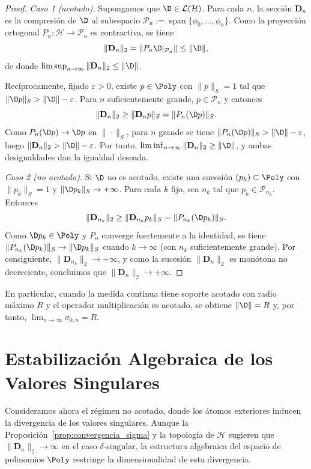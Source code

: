 \begin{proof}
	\emph{Caso 1 (acotado).} Supongamos que $\D\in\mathcal{L}(\mathcal{H})$. Para cada $n$, la sección $\mathbf{D}_n$ es la compresión de $\D$ al subespacio $\mathcal{P}_n:=\operatorname{span}\{\phi_0,\dots,\phi_n\}$. Como la proyección ortogonal $P_n:\mathcal{H}\to\mathcal{P}_n$ es contractiva, se tiene
	\[
		\|\mathbf{D}_n\|_2=\|P_n\D|_{\mathcal{P}_n}\|\le\|\D\|,
	\]
	de donde $\limsup_{n\to\infty}\|\mathbf{D}_n\|_2\le\|\D\|$.

	Recíprocamente, fijado $\varepsilon>0$, existe $p\in\Poly$ con $\|p\|_S=1$ tal que $\|\D p\|_S>\|\D\|-\varepsilon$. Para $n$ suficientemente grande, $p\in\mathcal{P}_n$ y entonces
	\[
		\|\mathbf{D}_n\|_2\ge\|\mathbf{D}_n p\|_S=\|P_n(\D p)\|_S.
	\]
	Como $P_n(\D p)\to\D p$ en $\|\cdot\|_S$, para $n$ grande se tiene $\|P_n(\D p)\|_S>\|\D\|-\varepsilon$, luego $\|\mathbf{D}_n\|_2>\|\D\|-\varepsilon$. Por tanto, $\liminf_{n\to\infty}\|\mathbf{D}_n\|_2\ge\|\D\|$, y ambas desigualdades dan la igualdad deseada.

	\emph{Caso 2 (no acotado).} Si $\D$ no es acotado, existe una sucesión $(p_k)\subset\Poly$ con $\|p_k\|_S=1$ y $\|\D p_k\|_S\to+\infty$. Para cada $k$ fijo, sea $n_k$ tal que $p_k\in\mathcal{P}_{n_k}$. Entonces
	\[
		\|\mathbf{D}_{n_k}\|_2\ge\|\mathbf{D}_{n_k}p_k\|_S=\|P_{n_k}(\D p_k)\|_S.
	\]
	Como $\D p_k\in\Poly$ y $P_n$ converge fuertemente a la identidad, se tiene $\|P_{n_k}(\D p_k)\|_S\to\|\D p_k\|_S$ cuando $k\to\infty$ (con $n_k$ suficientemente grande). Por consiguiente, $\|\mathbf{D}_{n_k}\|_2\to+\infty$, y como la sucesión $\|\mathbf{D}_n\|_2$ es monótona no decreciente, concluimos que $\|\mathbf{D}_n\|_2\to+\infty$.
\end{proof}

En particular, cuando la medida continua tiene soporte acotado con radio máximo $R$ y el operador multiplicación es acotado, se obtiene $\|\D\| = R$ y, por tanto, $\lim_{n \to \infty} \sigma_{0,n} = R$.

\section{Estabilización Algebraica de los Valores Singulares}

Consideramos ahora el régimen no acotado, donde los átomos exteriores inducen la divergencia de los valores singulares. Aunque la Proposición~\ref{prop:convergencia_sigma} y la topología de $\mathcal{H}$ sugieren que $\|\mathbf{D}_n\|_2 \to \infty$ en el caso $\delta$-singular, la estructura algebraica del espacio de polinomios $\Poly$ restringe la dimensionalidad de esta divergencia.

